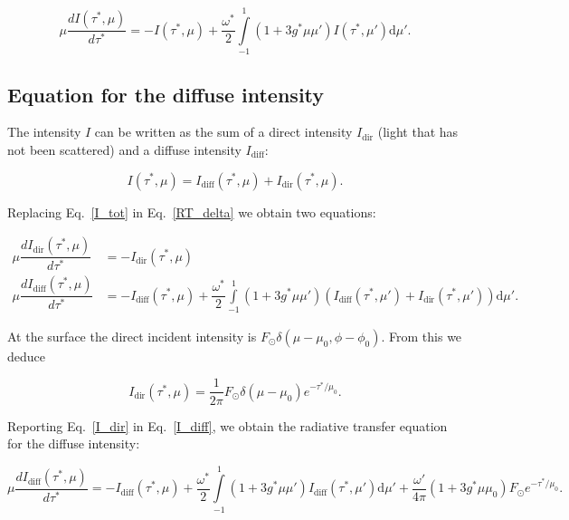 \documentclass[a4paper,11pt]{article}
\begin{document}
\begin{equation}
\boxed{
\mu\dfrac{dI(\tau^*,\mu)}{d\tau^*} =- I(\tau^*,\mu)+\dfrac{\omega^*}{2}\displaystyle\int\limits_{-1}^{1}(1+3g^*\mu\mu')I(\tau^*,\mu') \mathrm{d} \mu'.
}
\label{RT_delta}
\end{equation} 
  
\subsection{Equation for the diffuse intensity}

The intensity $I$ can be written as the sum of a direct intensity $I_{\textrm{dir}}$ (light that has not been scattered) and a diffuse intensity $I_{\textrm{diff}}$:


\begin{equation}
I(\tau^*,\mu)=I_{\textrm{diff}}(\tau^*,\mu)+I_{\textrm{dir}}(\tau^*,\mu).
\label{I_tot}
\end{equation}

\noindent Replacing Eq.~\ref{I_tot} in Eq.~\ref{RT_delta} we obtain two equations:

\begin{align}
\mu\dfrac{dI_{\textrm{dir}}(\tau^*,\mu)}{d\tau^*} & =- I_{\textrm{dir}}(\tau^*,\mu) \\
\mu\dfrac{dI_{\textrm{diff}}(\tau^*,\mu)}{d\tau^*} & =- I_{\textrm{diff}}(\tau^*,\mu)+\dfrac{\omega^*}{2}\displaystyle\int\limits_{-1}^{1}(1+3g^*\mu\mu')\left(I_{\textrm{diff}}(\tau^*,\mu')+I_{\textrm{dir}}(\tau^*,\mu')\right) \mathrm{d} \mu'.  \label{I_diff}
\end{align}

\noindent At the surface the direct incident intensity is $F_\odot\delta(\mu-\mu_0,\phi-\phi_0)$. From this we deduce

\begin{equation}
I_{\textrm{dir}}(\tau^*,\mu)=\dfrac{1}{2\pi}F_\odot\delta(\mu-\mu_0)e^{-\tau^*/\mu_0}.
\label{I_dir}
\end{equation}

\noindent Reporting Eq.~\ref{I_dir} in Eq.~\ref{I_diff}, we obtain the radiative transfer equation for the diffuse intensity:

\begin{equation}
\mu\dfrac{dI_{\textrm{diff}}(\tau^*,\mu)}{d\tau^*} =- I_{\textrm{diff}}(\tau^*,\mu)+\dfrac{\omega^*}{2}\displaystyle\int\limits_{-1}^{1}(1+3g^*\mu\mu')I_{\textrm{diff}}(\tau^*,\mu') \mathrm{d} \mu' + \dfrac{\omega'}{4\pi} (1+3g^*\mu\mu_0) F_\odot e^{-\tau^*/\mu_0}.
\label{RT4}
\end{equation}
\end{document}
